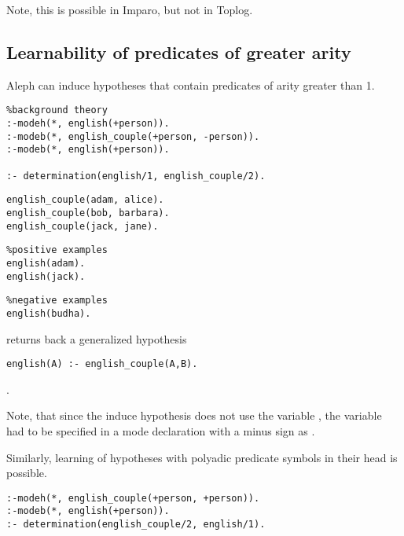 Note, this is possible in Imparo, but not in Toplog.

\subsection{Learnability of predicates of greater arity}
Aleph can induce hypotheses that contain predicates of arity greater than 1.
\begin{lstlisting}
%background theory
:-modeh(*, english(+person)).
:-modeb(*, english_couple(+person, -person)).
:-modeb(*, english(+person)).

:- determination(english/1, english_couple/2).
\end{lstlisting}
\begin{minipage}[t]{.40\textwidth}
\begin{lstlisting}
english_couple(adam, alice).
english_couple(bob, barbara).
english_couple(jack, jane).
\end{lstlisting}
\end{minipage}
\begin{minipage}[t]{.27\textwidth}
\begin{lstlisting}
%positive examples
english(adam).
english(jack).
\end{lstlisting}
\end{minipage}
\begin{minipage}[t]{.25\textwidth}
\begin{lstlisting}
%negative examples
english(budha).
\end{lstlisting}
\end{minipage}

returns back a generalized hypothesis
\begin{lstlisting}
english(A) :- english_couple(A,B).
\end{lstlisting}.

Note, that since the induce hypothesis does not use the variable , the variable had to be specified in a mode declaration with a minus sign as .

Similarly, learning of hypotheses with polyadic predicate symbols in their head is possible.

\begin{lstlisting}
:-modeh(*, english_couple(+person, +person)).
:-modeb(*, english(+person)).
:- determination(english_couple/2, english/1).
\end{lstlisting}

